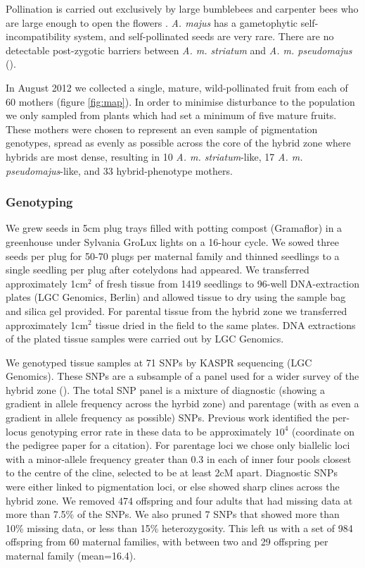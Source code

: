 \documentclass[10pt, a4paper, twocolumn]{article} %
\begin{document}
Pollination is carried out exclusively by large bumblebees and carpenter bees who are large enough to open the flowers \cite{vargas2010occluded, andalo2019prevalence}. \textit{A. majus} has a gametophytic self-incompatibility system, and self-pollinated seeds are very rare. There are no detectable post-zygotic barriers between \textit{A. m. striatum} and \textit{A. m. pseudomajus} (\cite{andalo2010post}).

In August 2012 we collected a single, mature, wild-pollinated fruit from each of 60 mothers (figure \ref{fig:map}). In order to minimise disturbance to the population we only sampled from plants which had set a minimum of five mature fruits. These mothers were chosen to represent an even sample of pigmentation genotypes, spread as evenly as possible across the core of the hybrid zone where hybrids are most dense, resulting in 10 \textit{A. m. striatum}-like, 17 \textit{A. m. pseudomajus}-like, and 33 hybrid-phenotype mothers.

\subsubsection{Genotyping}

We grew seeds in 5cm plug trays filled with potting compost (Gramaflor) in a greenhouse under Sylvania GroLux lights on a 16-hour cycle. We sowed three seeds per plug for 50-70 plugs per maternal family and thinned seedlings to a single seedling per plug after cotelydons had appeared. We transferred approximately 1cm$^2$ of fresh tissue from 1419 seedlings to 96-well DNA-extraction plates (LGC Genomics, Berlin) and allowed tissue to dry using the sample bag and silica gel provided. For parental tissue from the hybrid zone we transferred approximately 1cm$^2$ tissue dried in the field to the same plates. DNA extractions of the plated tissue samples were carried out by LGC Genomics.

We genotyped tissue samples at 71 SNPs by KASPR sequencing (LGC Genomics). These SNPs are a subsample of a panel used for a wider survey of the hybrid zone (\cite{surendranadh2022effects}). The total SNP panel is a mixture of  diagnostic (showing a gradient in allele frequency across the hyrbid zone) and parentage (with as even a gradient in allele frequency as possible) SNPs. Previous work identified the per-locus genotyping error rate in these data to be approximately $10^4$ (coordinate on the pedigree paper for a citation). For parentage loci we chose only biallelic loci with a minor-allele frequency greater than 0.3 in each of inner four pools closest to the centre of the cline, selected to be at least 2cM apart. Diagnostic SNPs were either linked to pigmentation loci, or else showed sharp clines across the hybrid zone. We removed 474 offspring and four adults that had missing data at more than 7.5\% of the SNPs. We also pruned 7 SNPs that showed more than 10\% missing data, or less than 15\% heterozygosity. This left us with a set of 984 offspring from 60 maternal families, with between two and 29 offspring per maternal family (mean=16.4).
\end{document}

